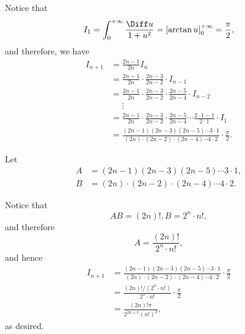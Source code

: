 \begin{enumerate}
          Notice that
          \[
              I_1 = \int_0^{+\infty} \frac{\Diff u}{1 + u^2} = \left[\arctan u\right]^{+\infty}_0 = \frac{\pi}{2},
          \]
          and therefore, we have
          \begin{align*}
              I_{n + 1} & = \frac{2n - 1}{2n} I_n                                                                                                      \\
                        & = \frac{2n - 1}{2n} \cdot \frac{2n - 3}{2n - 2} \cdot I_{n - 1}                                                              \\
                        & = \frac{2n - 1}{2n} \cdot \frac{2n - 3}{2n - 2} \cdot \frac{2n - 5}{2n - 4} \cdot I_{n - 2}                                  \\
                        & \phantom{=} \vdots                                                                                                           \\
                        & = \frac{2n - 1}{2n} \cdot \frac{2n - 3}{2n - 2} \cdot \frac{2n - 5}{2n - 4} \cdots \frac{2 \cdot 1 - 1}{2 \cdot 1} \cdot I_1 \\
                        & = \frac{(2n - 1)(2n - 3)(2n - 5) \cdots 3 \cdot 1}{(2n) \cdot (2n - 2) \cdot (2n - 4) \cdots 4 \cdot 2} \cdot \frac{\pi}{2}.
          \end{align*}

          Let
          \begin{align*}
              A & = (2n - 1)(2n - 3)(2n - 5) \cdots 3 \cdot 1,           \\
              B & = (2n) \cdot (2n - 2) \cdot (2n - 4) \cdots 4 \cdot 2.
          \end{align*}

          Notice that
          \[
              AB = (2n)!, B = 2^n \cdot n!,
          \]
          and therefore
          \[
              A = \frac{(2n)!}{2^n \cdot n!},
          \]
          and hence
          \begin{align*}
              I_{n + 1} & = \frac{(2n - 1)(2n - 3)(2n - 5) \cdots 3 \cdot 1}{(2n) \cdot (2n - 2) \cdot (2n - 4) \cdots 4 \cdot 2} \cdot \frac{\pi}{2} \\
                        & = \frac{(2n)! / (2^n \cdot n!)}{2^n \cdot n!} \cdot \frac{\pi}{2}                                                           \\
                        & = \frac{(2n)! \pi}{2^{2n + 1} (n!)^2},
          \end{align*}
          as desired.


\end{enumerate}
